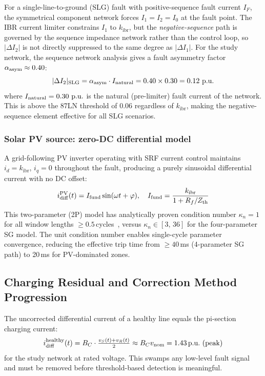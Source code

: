 \documentclass[journal,twoside,10pt]{IEEEtran}
\newcommand{\kibr}{k_{\mathrm{ibr}}}
\newcommand{\kn}{\kappa_n}
\newcommand{\pu}{\,\text{p.u.}}
\begin{document}
For a single-line-to-ground (SLG) fault with positive-sequence fault current
$I_F$, the symmetrical component network forces $I_1 = I_2 = I_0$ at the
fault point.  The IBR current limiter constrains $I_1$ to $\kibr$, but the
\emph{negative-sequence} path is governed by the sequence impedance network
rather than the control loop, so $|\Delta I_2|$ is not directly suppressed
to the same degree as $|\Delta I_1|$.  For the study network, the sequence
network analysis gives a fault asymmetry factor $\alpha_{\rm asym} \approx
0.40$:
\begin{equation}
  |\Delta I_2|_{\rm SLG} = \alpha_{\rm asym} \cdot I_{\rm natural}
                          = 0.40 \times 0.30 = 0.12\,\pu
  \label{eq:I2slg}
\end{equation}
where $I_{\rm natural} = 0.30\,\pu$ is the natural (pre-limiter) fault current
of the network.  This is above the 87LN threshold of 0.06\,\pu regardless
of $\kibr$, making the negative-sequence element effective for all SLG scenarios.

\subsubsection{Solar PV source: zero-DC differential model}

A grid-following PV inverter operating with SRF current control maintains
$i_d = \kibr$, $i_q = 0$ throughout the fault, producing a purely sinusoidal
differential current with no DC offset:
\begin{equation}
  i_{\rm diff}^{\rm PV}(t) = I_{\rm fund}\sin(\omega t + \varphi),
  \quad I_{\rm fund} = \frac{\kibr}{1 + R_f/Z_{\rm th}}
  \label{eq:pv_model}
\end{equation}
This two-parameter (2P) model has analytically proven condition number
$\kn = 1$ for all window lengths $\geq 0.5$\,cycles~\cite{SAMBP_TR62},
versus $\kn \in [3,\,36]$ for the four-parameter SG model.
The unit condition number enables single-cycle parameter convergence,
reducing the effective trip time from $\geq 40$\,ms (4-parameter SG path)
to 20\,ms for PV-dominated zones.

\subsection{Charging Residual and Correction Method Progression}
\label{sec:chargingprog}

The uncorrected differential current of a healthy line equals the pi-section
charging current:
\begin{equation}
  i_{\rm diff}^{\rm healthy}(t) = B_C \cdot \tfrac{v_S(t) + v_R(t)}{2}
  \approx B_C v_{\rm nom} = 1.43\pu\ \text{(peak)}
  \label{eq:uncorrected}
\end{equation}
for the study network at rated voltage.  This swamps any low-level fault
signal and must be removed before threshold-based detection is meaningful.
\end{document}
